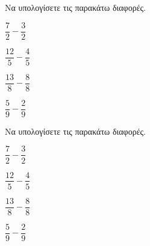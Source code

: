 Να υπολογίσετε τις παρακάτω διαφορές.
\begin{multicols}{2}
\begin{alist}
\item $ \dfrac{7}{2}-\dfrac{3}{2} $
\item $ \dfrac{12}{5}-\dfrac{4}{5} $
\item $ \dfrac{13}{8}-\dfrac{8}{8} $
\item $ \dfrac{5}{9}-\dfrac{2}{9} $
\end{alist}
\end{multicols}
Να υπολογίσετε τις παρακάτω διαφορές.
\begin{multicols}{2}
\begin{alist}
\item $ \dfrac{7}{2}-\dfrac{3}{2} $
\item $ \dfrac{12}{5}-\dfrac{4}{5} $
\item $ \dfrac{13}{8}-\dfrac{8}{8} $
\item $ \dfrac{5}{9}-\dfrac{2}{9} $
\end{alist}
\end{multicols}
